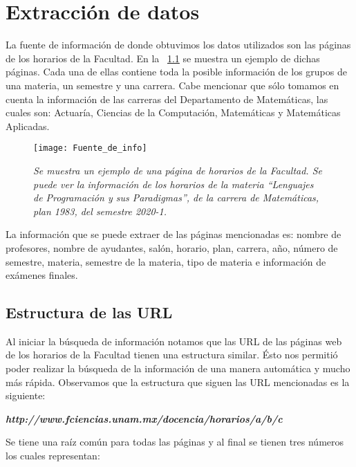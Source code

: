 \chapter{Extracción de datos}

La fuente de información de donde obtuvimos los datos utilizados son las páginas de los horarios de la Facultad. En la \figurename{~\ref{pagFC}} se muestra un ejemplo de dichas páginas. Cada una de ellas contiene toda la posible información de los grupos de una materia, un semestre y una carrera. Cabe mencionar que sólo tomamos en cuenta la información de las carreras del Departamento de Matemáticas, las cuales son: Actuaría, Ciencias de la Computación, Matemáticas y Matemáticas Aplicadas.

\begin{figure}[H]
\centering
\texttt{[image: Fuente\_de\_info]} %
\caption[\textit{Página de horarios de la Facultad}]{\textit{Se muestra un ejemplo de una página de horarios de la Facultad. Se puede ver la información de los horarios de la materia ``Lenguajes de Programación y sus Paradigmas'', de la carrera de Matemáticas, plan 1983, del semestre 2020-1.}}\label{pagFC}
\end{figure}

La información que se puede extraer de las páginas mencionadas es: nombre de profesores, nombre de ayudantes, salón, horario, plan, carrera, año, número de semestre, materia, semestre de la materia, tipo de materia e información de exámenes finales.


\section{Estructura de las URL}

Al iniciar la búsqueda de información notamos que las URL de las páginas web de los horarios de la Facultad tienen una estructura similar. Ésto nos permitió poder realizar la búsqueda de la información de una manera automática y mucho más rápida. Observamos que la estructura que siguen las URL mencionadas es la siguiente:
  
  \begin{center}
\textit{\textbf{http://www.fciencias.unam.mx/docencia/horarios/a/b/c}}
\end{center}

Se tiene una raíz común para todas las páginas y al final se tienen tres números los cuales representan:
  
